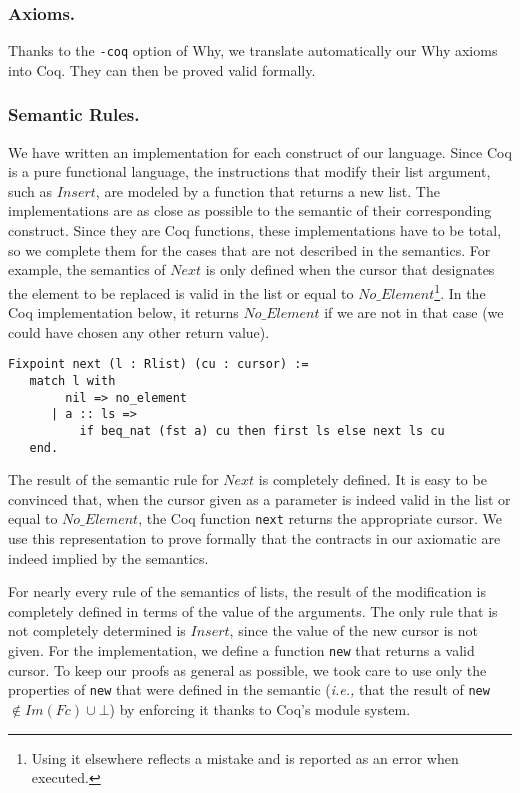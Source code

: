 \documentclass[runningheads,a4paper]{llncs}
\newcommand{\ie}{\textit{i.e.,}\xspace}
\newcommand{\Fc}{\ensuremath{\mathit{Fc}}\xspace}
\newcommand{\ImFc}{\ensuremath{\mathit{Im}(\Fc)}\xspace}
\newcommand{\Insert}{\ensuremath{\mathit{Insert}}\xspace}
\newcommand{\Next}{\ensuremath{\mathit{Next}}\xspace}
\newcommand{\NoElement}{\ensuremath{\mathit{No\_Element}}\xspace}
\begin{document}
\subsubsection{Axioms.}
Thanks to the \texttt{-coq} option of Why, we translate automatically our Why
axioms into Coq. They can then be proved valid formally.

\subsubsection{Semantic Rules.}

We have written an implementation for each construct of our language. Since Coq
is a pure functional language, the instructions that modify their list
argument, such as \Insert, are modeled by a function that returns a new list.
The implementations are as close as possible to the semantic of their
corresponding construct. Since they are Coq functions, these implementations
have to be total, so we complete them for the cases that are not described in
the semantics. For example, the semantics of \Next is only defined when the
cursor that designates the element to be replaced is valid in the list or equal
to \NoElement\footnote{Using it elsewhere reflects a mistake and is reported as
an error when executed.}. In the Coq implementation below, it returns \NoElement if we are
not in that case (we could have chosen any other return value).
\begin{verbatim}
Fixpoint next (l : Rlist) (cu : cursor) :=
   match l with
        nil => no_element
      | a :: ls =>
          if beq_nat (fst a) cu then first ls else next ls cu
   end.
\end{verbatim}
The result of the semantic rule for $\Next$ is completely defined. It is easy
to be convinced that, when the cursor given as a parameter is indeed valid in
the list or equal to $\NoElement$, the Coq function \texttt{next}
returns the appropriate cursor. We use this representation to prove formally
that the contracts in our axiomatic are indeed implied by the semantics.

For nearly every rule of the semantics of lists, the result of the modification
is completely defined in terms of the value of the arguments. The only rule
that is not completely determined is $\Insert$, since the value of the new
cursor is not given. For the implementation, we define a function \texttt{new}
that returns a valid cursor. To keep our proofs as general as possible, we
took care to use only the properties of \texttt{new} that were defined in the
semantic (\ie that the result of \texttt{new} $\notin \ImFc\cup \bot$) by
enforcing it thanks to Coq's module system.
\end{document}
